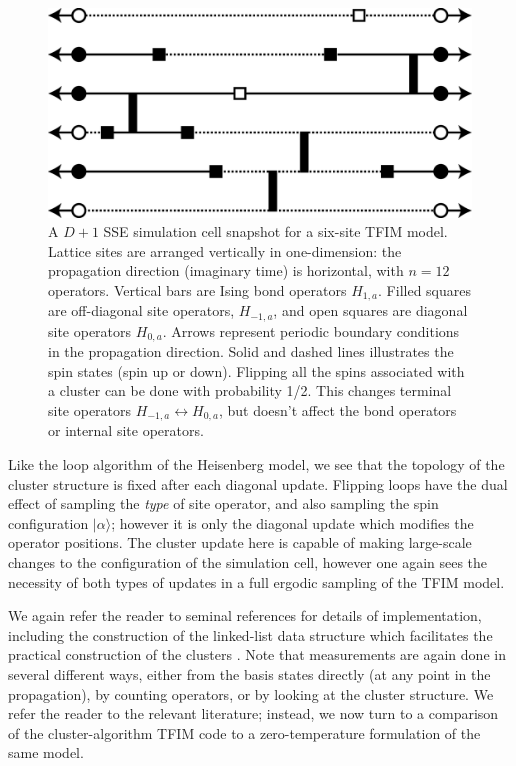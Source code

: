 \documentclass[vecphys]{svmult}
\begin{document}
\begin{figure}[t]
\centering
\includegraphics*[width=.9\textwidth]{finiteT_tfim.eps}
\caption[]{A $D+1$ SSE simulation cell snapshot for a six-site TFIM model.  Lattice sites are arranged vertically in one-dimension: the propagation direction (imaginary time) is horizontal, with $n=12$ operators.  
Vertical bars are Ising bond operators $H_{1,a}$.  Filled squares are off-diagonal site operators, $H_{-1,a}$, and open squares are diagonal site operators $H_{0,a}$.
Arrows represent periodic boundary conditions in the propagation direction.  
Solid and dashed lines illustrates the spin states (spin up or down).  Flipping all the spins associated with a cluster can be done with probability 1/2.  This changes terminal site operators $H_{-1,a} \leftrightarrow H_{0,a}$, but doesn't affect the bond operators or internal site operators.}
\label{fig:4}      
\end{figure} 

Like the loop algorithm of the Heisenberg model, we see that the topology of the cluster structure is fixed after each diagonal update.  Flipping loops have the dual effect of sampling the {\em type} of site operator, and also sampling the spin configuration $|\alpha \rangle$; however it is only the diagonal update which modifies the operator positions.  
The cluster update here is capable of making large-scale changes to the configuration of the simulation cell, however one again sees the necessity of both types of updates in a full ergodic sampling of the TFIM model.

We again refer the reader to seminal references for details of implementation, including the construction of the linked-list data structure which facilitates the practical construction of the clusters \cite{Melko:Sandvik03}.  Note that measurements are again done in several different ways, either from the basis states directly (at any point in the propagation), by counting operators, or by looking at the cluster structure.  We refer the reader to the relevant literature; instead, we now turn to a comparison of the cluster-algorithm TFIM code to a zero-temperature formulation of the same model.
\end{document}
